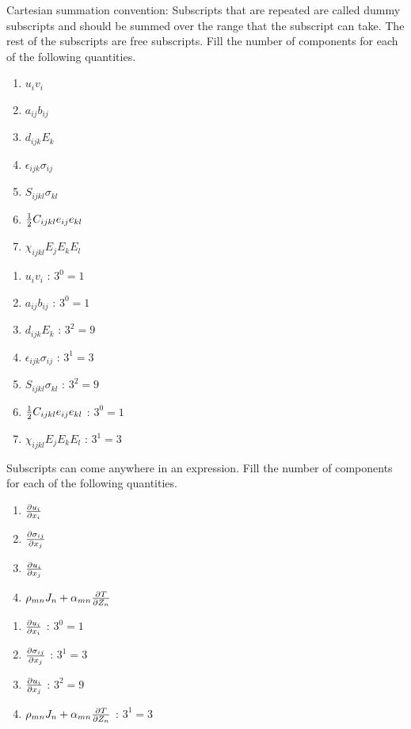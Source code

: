 \begin{question}
Cartesian summation convention: Subscripts that are repeated are called dummy subscripts and should be summed over the range that the subscript can take. The rest of the subscripts are free subscripts. 
Fill the number of components for each of the following quantities.

	\begin{enumerate}
		\item $u_i v_i$ 
		\item $a_{ij} b_{ij}$ 
		\item $d_{ijk} E_k$ 
		\item $\epsilon_{ijk} \sigma_{ij}$ 
		\item $S_{ijkl} \sigma_{kl}$ 
		\item ${1 \over 2} C_{ijkl} e_{ij} e_{kl}$ 
		\item $\chi_{ijkl} E_{j} E_{k} E_{l}$ 
	\end{enumerate}
\end{question}
\begin{solution}[print]
	\begin{enumerate}
		\item $u_i v_i$ : $3^0=1$
		\item $a_{ij} b_{ij}$ : $3^0=1$
		\item $d_{ijk} E_k$ : $3^2=9$
		\item $\epsilon_{ijk} \sigma_{ij}$ : $3^1=3$
		\item $S_{ijkl} \sigma_{kl}$ : $3^2=9$
		\item ${1 \over 2} C_{ijkl} e_{ij} e_{kl}$ : $3^0=1$
		\item $\chi_{ijkl} E_{j} E_{k} E_{l}$ : $3^1=3$
	\end{enumerate}
\end{solution}


\begin{question}
Subscripts can come anywhere in an expression.
Fill the number of components for each of the following quantities.
	\begin{enumerate}
		\item $\partial u_i \over \partial x_i$
		\item $\partial \sigma_{ij} \over \partial x_j$
		\item $\partial u_i \over \partial x_j$
		\item $\rho_{mn} J_n + \alpha_{mn} {\partial T \over \partial Z_n}$
	\end{enumerate}
\end{question}
\begin{solution}[print]
	\begin{enumerate}
		\item $\partial u_i \over \partial x_i$ : $3^0=1$
		\item $\partial \sigma_{ij} \over \partial x_j$ : $3^1=3$
		\item $\partial u_i \over \partial x_j$ : $3^2=9$
		\item $\rho_{mn} J_n + \alpha_{mn} {\partial T \over \partial Z_n}$ : $3^1=3$
	\end{enumerate}
\end{solution}

